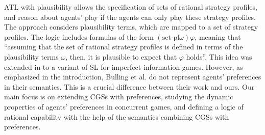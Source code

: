 ATL with plausibility \cite{BullingJD08} allows the specification of sets of
rational strategy profiles, and reason about agents' play if the agents can only play  these strategy profiles. The approach considers plausibility terms, which are mapped to a set of strategy profiles.  
The logic includes formulas of the form $(\text{set-pl} \omega) \varphi$, meaning  that ``assuming that the set of rational strategy profiles is defined in terms of the plausibility terms $\omega$, then, it is
plausible to expect that $\varphi$ holds''. %
This idea was extended in  \cite{BullingJ09} to a variant of SL for imperfect information games.
However, as emphasized in the introduction, 
Bulling et al. do not 
represent 
agents' 
preferences in their  semantics. 
This is a crucial
difference between their work and ours.
Our main focus is
on  extending CGSs
with preferences,
studying the dynamic properties
of agents' preferences in concurrent games,
and defining a logic
of rational capability with the help
of the semantics
combining CGSs with preferences.